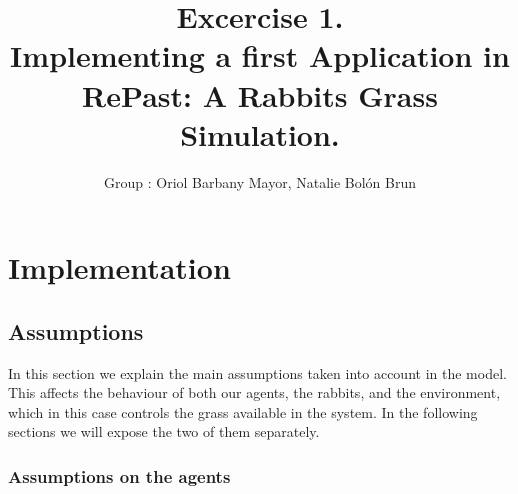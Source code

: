 \documentclass[11pt]{article}
\title{\bf Excercise 1.\\ Implementing a first Application in RePast: A Rabbits Grass Simulation.}
\author{Group \textnumero 54: Oriol Barbany Mayor, Natalie Bolón Brun}
\begin{document}
\maketitle

\section{Implementation}

\subsection{Assumptions}

In this section we explain the main assumptions taken into account in the model. This affects the behaviour of both our agents, the rabbits, and the environment, which in this case controls the grass available in the system. In the following sections we will expose the two of them separately.

\subsubsection{Assumptions on the \textbf{agents}}
\end{document}
